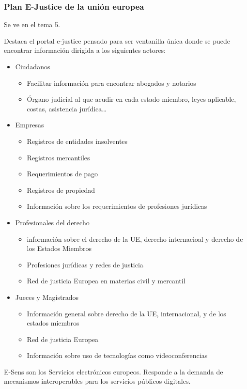     \subsubsection{Plan E-Justice de la unión europea} %
        Se ve en el tema 5.

        Destaca el portal e-justice pensado para ser ventanilla única donde se puede encontrar información dirigida a los siguientes actores:
        \begin{itemize}
            \item Ciudadanos \begin{itemize}
                \item Facilitar información para encontrar abogados y notarios
                \item Órgano judicial al que acudir en cada estado miembro, leyes aplicable, costas, asistencia jurídica\dots
            \end{itemize}
            \item Empresas \begin{itemize}
                \item Registros de entidades insolventes
                \item Registros mercantiles
                \item Requerimientos de pago
                \item Registros de propiedad
                \item Información sobre los requerimientos de profesiones jurídicas
            \end{itemize}
            \item Profesionales del derecho \begin{itemize}
                \item información sobre el derecho de la UE, derecho internacioal y derecho de los Estados Miembros
                \item Profesiones jurídicas y redes de justicia
                \item Red de justicia Europea en materias civil y mercantil
            \end{itemize}
            \item Jueces y Magistrados \begin{itemize}
                \item Información general sobre derecho de la UE, internacional, y de los estados miembros
                \item Red de justicia Europea 
                \item Información sobre uso de tecnologías como videoconferencias
            \end{itemize}
        \end{itemize}

        E-Sens son los Servicios electrónicos europeos. Responde a la demanda de mecanismos interoperables para los servicios públicos digitales.
